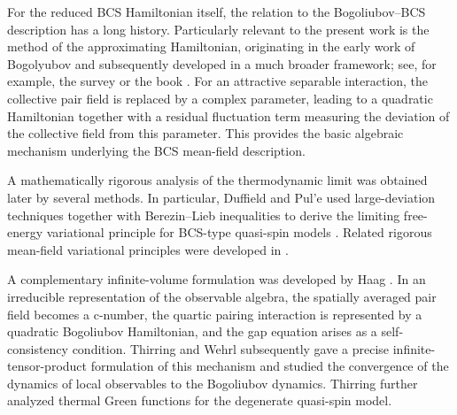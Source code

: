 \documentclass[11pt]{amsart}
\theoremstyle{definition}
\numberwithin{equation}{section}
\newcommand{\1}{\mathbf 1}
\begin{document}

For the reduced BCS Hamiltonian itself, the relation to the Bogoliubov--BCS description has a long history. Particularly relevant to the present work is the method of the approximating Hamiltonian, originating in the early work of Bogolyubov and subsequently developed in a much broader framework; see, for example, the survey \cite{BogolRev} or the book \cite{BogolyubovJr1972}. For an attractive separable interaction, the collective pair field is replaced by a complex parameter, leading to a quadratic Hamiltonian together with a residual fluctuation term measuring the deviation of the collective field from this parameter. This provides the basic algebraic mechanism underlying the BCS mean-field description.

A mathematically rigorous analysis of the thermodynamic limit was obtained later by several methods. In particular, Duffield and Pul'e used large-deviation techniques together with Berezin--Lieb inequalities to derive the limiting free-energy variational principle for BCS-type quasi-spin models \cite{DuffieldPule1987,DuffieldPule1988}. Related rigorous mean-field variational principles were developed in \cite{CeglaLewisRaggio1988,PetzRaggioVerbeure1989,RaggioWerner1989BCS,RaggioWerner1991}.




A complementary infinite-volume formulation was developed by Haag \cite{Haag1962}. In an irreducible representation of the observable algebra, the spatially averaged pair field becomes a c-number, the quartic pairing interaction is represented by a quadratic Bogoliubov Hamiltonian, and the gap equation arises as a self-consistency condition. Thirring and Wehrl \cite{ThirringWehrl1967} subsequently gave a precise infinite-tensor-product formulation of this mechanism and studied the convergence of the dynamics of local observables to the Bogoliubov dynamics. Thirring \cite{Thirring1968} further analyzed thermal Green functions for the degenerate quasi-spin model.
\end{document}
